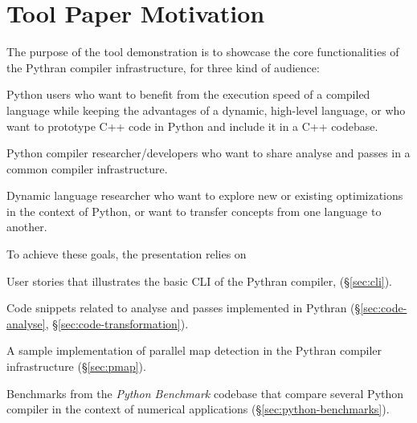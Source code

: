 \documentclass{llncs}
\begin{document}
\setcounter{page}{6}



%
%
%

\section*{Tool Paper Motivation}

The purpose of the tool demonstration is to showcase the core functionalities
of the Pythran compiler infrastructure, for three kind of audience:
\begin{inparaenum} \item Python users who want to benefit from the execution
        speed of a compiled language while keeping the advantages of a dynamic,
        high-level language, or who want to prototype C++ code in Python and
        include it in a C++ codebase.  \item Python compiler
        researcher/developers who want to share analyse and passes in a common
    compiler infrastructure.  \item Dynamic language researcher who want to
        explore new or existing optimizations in the context of Python, or want
        to transfer concepts from one language to another.  \end{inparaenum}

To achieve these goals, the presentation relies on \begin{inparaenum} \item User
    stories that illustrates the basic \ac{CLI} of the Pythran compiler,
(\S\ref{sec:cli}).  \item Code snippets related to analyse and passes
    implemented in Pythran (\S\ref{sec:code-analyse},
\S\ref{sec:code-transformation}). \item A sample implementation of parallel map
detection in the Pythran compiler infrastructure (\S\ref{sec:pmap}).  \item
Benchmarks from the \emph{Python Benchmark} codebase that compare several
Python compiler in the context of numerical applications
(\S\ref{sec:python-benchmarks}). \end{inparaenum}
\end{document}
